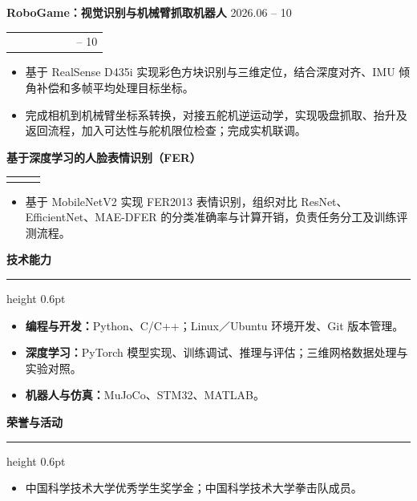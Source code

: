 \documentclass[10pt,a4paper,fontset=fandol]{ctexart}
\makeatletter
\newcommand{\resumesection}[1]{
  \vspace{0.72em}
  {\large\bfseries\color{accent} #1\par}
  \vspace{0.22em}
  {\color{accent}\hrule height 0.6pt}
  \vspace{0.32em}
}
\newcommand{\entry}[4]{
  \vspace{0.35em}
  {\normalsize\bfseries #1}
  \if\relax\detokenize{#3}\relax
    \hfill{\small\color{textgray}#4}\par
  \else
    \par
    \begin{tabularx}{\linewidth}{@{}>{\small\color{textgray}\RaggedRight\arraybackslash}X >{\small\color{textgray}\RaggedLeft\arraybackslash}p{0.33\linewidth}@{}}
      #3 & #4
    \end{tabularx}
  \fi
  \par\vspace{0.08em}
}
\makeatother
\begin{document}
\entry{RoboGame：视觉识别与机械臂抓取机器人}{}{}{2026.06 -- 10}
\begin{itemize}
  \item 基于 RealSense D435i 实现彩色方块识别与三维定位，结合深度对齐、IMU 倾角补偿和多帧平均处理目标坐标。
  \item 完成相机到机械臂坐标系转换，对接五舵机逆运动学，实现吸盘抓取、抬升及返回流程，加入可达性与舵机限位检查；完成实机联调。
\end{itemize}

\entry{基于深度学习的人脸表情识别（FER）}{}{}{}
\begin{itemize}
  \item 基于 MobileNetV2 实现 FER2013 表情识别，组织对比 ResNet、EfficientNet、MAE-DFER 的分类准确率与计算开销，负责任务分工及训练评测流程。
\end{itemize}

\resumesection{技术能力}
\begin{itemize}
  \item \textbf{编程与开发：}Python、C/C++；Linux／Ubuntu 环境开发、Git 版本管理。
  \item \textbf{深度学习：}PyTorch 模型实现、训练调试、推理与评估；三维网格数据处理与实验对照。
  \item \textbf{机器人与仿真：}MuJoCo、STM32、MATLAB。
\end{itemize}

\resumesection{荣誉与活动}
\begin{itemize}
  \item 中国科学技术大学优秀学生奖学金；中国科学技术大学拳击队成员。
\end{itemize}
\end{document}
